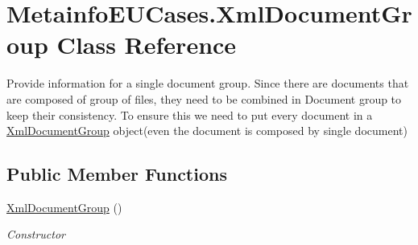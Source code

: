 \hypertarget{class_metainfo_e_u_cases_1_1_xml_document_group}{\section{Metainfo\-E\-U\-Cases.\-Xml\-Document\-Group Class Reference}
\label{class_metainfo_e_u_cases_1_1_xml_document_group}
}


Provide information for a single document group. Since there are documents that are composed of group of files, they need to be combined in Document group to keep their consistency. To ensure this we need to put every document in a \hyperlink{class_metainfo_e_u_cases_1_1_xml_document_group}{Xml\-Document\-Group} object(even the document is composed by single document)  


\subsection*{Public Member Functions}
\begin{DoxyCompactItemize}
\item 
\hyperlink{class_metainfo_e_u_cases_1_1_xml_document_group_ad0ae246d45963e9f002b63b4cb348380}{Xml\-Document\-Group} ()
\begin{DoxyCompactList}\small\item\em Constructor \end{DoxyCompactList}\end{DoxyCompactItemize}
